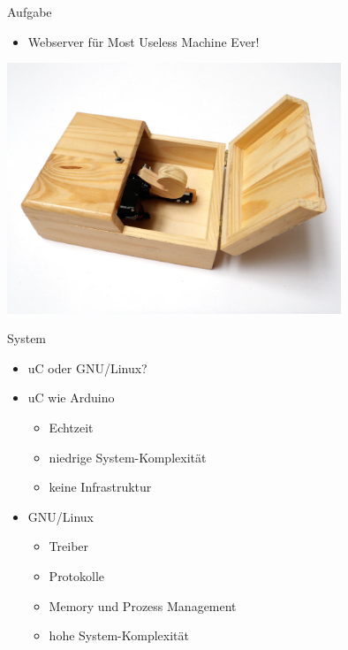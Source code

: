 \begin{frame}{Aufgabe}
	\begin{itemize}
		\item Webserver für Most Useless Machine Ever!
	\end{itemize}
	\begin{center}
		\includegraphics[width=0.75\textwidth]{res/mume.jpg}
		\cite{mumePic}
	\end{center}
\end{frame}

\begin{frame}{System}
	\begin{itemize}
		\item uC oder GNU/Linux?
		\item uC wie Arduino
		\begin{itemize}
			\item Echtzeit
			\item niedrige System-Komplexität
			\item keine Infrastruktur
		\end{itemize}
		\item GNU/Linux
		\begin{itemize}
			\item Treiber
			\item Protokolle
			\item Memory und Prozess Management
			\item hohe System-Komplexität
		\end{itemize}
	\end{itemize}
\end{frame}


